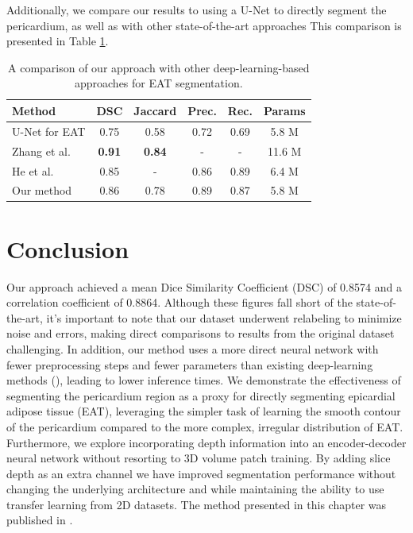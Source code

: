 Additionally, we compare our results to using a U-Net to directly segment the pericardium, as well as with other state-of-the-art approaches This comparison is presented in Table \ref{tab:comparison}.

\begin{table}[h]
\renewcommand{\arraystretch}{1.4}
\caption{A comparison of our approach with other deep-learning-based approaches for EAT segmentation.}
\centering
\begin{tabularx}{\textwidth}{Xccccc} 
 Method & DSC & Jaccard & Prec. & Rec. & Params \\
 \hline
 U-Net for EAT & 0.75 & 0.58 & 0.72 & 0.69 & 5.8 M \\ 
 Zhang et al. \cite{Zhang2020} & \textbf{0.91} & \textbf{0.84} & - & - & 11.6 M \\
 He et al. \cite{he2020} & 0.85 & - & 0.86 & 0.89 & 6.4 M \\
 Our method & 0.86 & 0.78 & 0.89 & 0.87 & 5.8 M \\
\end{tabularx}
\label{tab:comparison}
\end{table}

\section{Conclusion}\label{conclusion}

Our approach achieved a mean Dice Similarity Coefficient (DSC) of 0.8574 and a correlation coefficient of 0.8864. Although these figures fall short of the state-of-the-art, it's important to note that our dataset underwent relabeling to minimize noise and errors, making direct comparisons to results from the original dataset challenging. In addition, our method uses a more direct neural network with fewer preprocessing steps and fewer parameters than existing deep-learning methods (\cite{Commandeur2018, Li2019, he2020}), leading to lower inference times.  We demonstrate the effectiveness of segmenting the pericardium region as a proxy for directly segmenting epicardial adipose tissue (EAT), leveraging the simpler task of learning the smooth contour of the pericardium compared to the more complex, irregular distribution of EAT. Furthermore, we explore incorporating depth information into an encoder-decoder neural network without resorting to 3D volume patch training. By adding slice depth as an extra channel we have improved segmentation performance without changing the underlying architecture and while maintaining the ability to use transfer learning from 2D datasets. The method presented in this chapter was published in \cite{bencevicEpicardialAdiposeTissue2021}.
